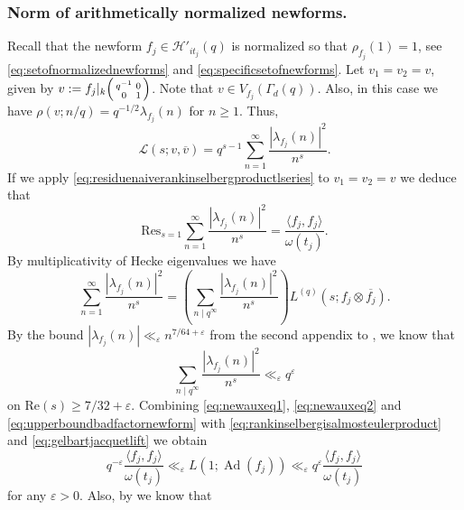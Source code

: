 \documentclass{article}
\theoremstyle{named}
\newcommand{\HH}{\mathcal{H}}
\renewcommand{\L}{\mathcal{L}}
\DeclareMathOperator{\Ad}{Ad}
\begin{document}
\subsubsection{Norm of arithmetically normalized newforms.}
Recall that the newform $f_j \in \HH'_{it_j}(q)$ is normalized so that $\rho_{f_j}(1) = 1$, see \eqref{eq:setofnormalizednewforms} and \eqref{eq:specificsetofnewforms}. Let $v_1 = v_2 = v$, given by $v := f_j|_k \begin{psmallmatrix}
    q^{-1} & 0\\
    0 & 1
\end{psmallmatrix}$. Note that $v \in V_{f_j}(\Gamma_d(q))$. Also, in this case we have $\rho(v; n/q) = q^{-1/2}\lambda_{f_j}(n)$ for $n \geq 1$. Thus, 
\begin{equation*}
\L(s; v, \overline{v}) = q^{s-1}\sum_{n = 1}^\infty \frac{|\lambda_{f_j}(n)|^2}{n^s}.
\end{equation*}
If we apply \eqref{eq:residuenaiverankinselbergproductlseries} to $v_1 = v_2 = v$ we deduce that 
\begin{equation}\label{eq:newauxeq1}
    \text{Res}_{s = 1}\sum_{n = 1}^\infty \frac{|\lambda_{f_j}(n)|^2}{n^s} = \frac{\langle f_j, f_j \rangle}{\omega(t_j)}.
\end{equation}
By multiplicativity of Hecke eigenvalues we have 
\begin{equation}\label{eq:newauxeq2}
    \sum_{n = 1}^\infty \frac{|\lambda_{f_j}(n)|^2}{n^s} = \left(\sum_{n \mid q^\infty} \frac{|\lambda_{f_j}(n)|^2}{n^s}\right) L^{(q)}(s; f_j \otimes \overline{f_j}).
\end{equation} 
By the bound $|\lambda_{f_j}(n)| \ll_\varepsilon n^{7/64 + \varepsilon}$ from the second appendix to \cite{kimramakrishnansarnak2003}, we know that
\begin{equation}\label{eq:upperboundbadfactornewform}
    \sum_{n \mid q^\infty} \frac{|\lambda_{f_j}(n)|^2}{n^s} \ll_{\varepsilon} q^\varepsilon
\end{equation}
on $\text{Re}(s) \geq 7/32 + \varepsilon$. Combining \eqref{eq:newauxeq1}, \eqref{eq:newauxeq2} and \eqref{eq:upperboundbadfactornewform} with \eqref{eq:rankinselbergisalmosteulerproduct} and \eqref{eq:gelbartjacquetlift} we obtain 
\begin{equation}\label{eq:newauxeq3}
    q^{-\varepsilon} \frac{\langle f_j, f_j \rangle}{\omega(t_j)} \ll_\varepsilon L(1; \Ad(f_j)) \ll_\varepsilon q^{\varepsilon}\frac{\langle f_j, f_j \rangle}{\omega(t_j)}
\end{equation}
for any $\varepsilon > 0$. Also, by \cite{hoffsteinlockhart} we know that  
\end{document}
